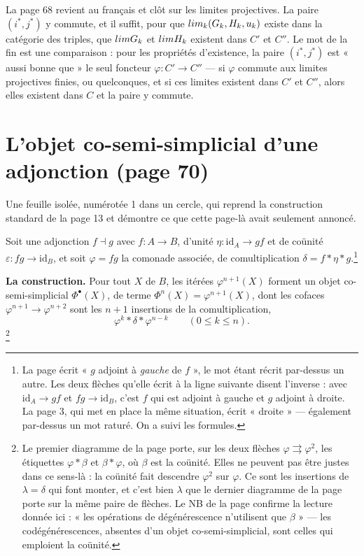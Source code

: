 \documentclass[11pt,a4paper]{article}
\begin{document}
La page 68 revient au français et clôt sur les limites projectives. La paire
$(i^{*}, j^{*})$ y commute, et il suffit, pour que
$\varprojlim_{k}(G_{k}, H_{k}, u_{k})$ existe dans la catégorie des triples,
que $\varprojlim G_{k}$ et $\varprojlim H_{k}$ existent dans $C'$ et $C''$. Le
mot de la fin est une comparaison : pour les propriétés d'existence, la paire
$(i^{*}, j^{*})$ est « aussi bonne que » le seul foncteur
$\varphi : C' \to C''$ — si $\varphi$ commute aux limites projectives finies,
ou quelconques, et si ces limites existent dans $C'$ et $C''$, alors elles
existent dans $C$ et la paire y commute.

\section*{L'objet co-semi-simplicial d'une adjonction (page 70)}

Une feuille isolée, numérotée 1 dans un cercle, qui reprend la construction
standard de la page 13 et démontre ce que cette page-là avait seulement
annoncé.

Soit une adjonction $f \dashv g$ avec $f : A \to B$, d'unité
$\eta : \mathrm{id}_{A} \to gf$ et de coünité
$\varepsilon : fg \to \mathrm{id}_{B}$, et soit $\varphi = fg$ la comonade
associée, de comultiplication $\delta = f * \eta * g$.\footnote{La page écrit
« $g$ adjoint à \emph{gauche} de $f$ », le mot étant récrit par-dessus un
autre. Les deux flèches qu'elle écrit à la ligne suivante disent l'inverse :
avec $\mathrm{id}_{A} \to gf$ et $fg \to \mathrm{id}_{B}$, c'est $f$ qui est
adjoint à gauche et $g$ adjoint à droite. La page 3, qui met en place la même
situation, écrit « droite » — également par-dessus un mot raturé. On a suivi
les formules.}


\textbf{La construction.} Pour tout $X$ de $B$, les itérées $\varphi^{n+1}(X)$
forment un objet co-semi-simplicial $\Phi^{\bullet}(X)$, de terme
$\Phi^{n}(X) = \varphi^{n+1}(X)$, dont les cofaces
$\varphi^{n+1} \to \varphi^{n+2}$ sont les $n+1$ insertions de la
comultiplication,
\[
  \varphi^{k} * \delta * \varphi^{n-k} \qquad (0 \leqslant k \leqslant n) .
\]
\footnote{Le premier diagramme de la page porte, sur les deux flèches
$\varphi \rightrightarrows \varphi^{2}$, les étiquettes $\varphi * \beta$ et
$\beta * \varphi$, où $\beta$ est la coünité. Elles ne peuvent pas être justes
dans ce sens-là : la coünité fait descendre $\varphi^{2}$ sur $\varphi$. Ce
sont les insertions de $\lambda = \delta$ qui font monter, et c'est bien
$\lambda$ que le dernier diagramme de la page porte sur la même paire de
flèches. Le NB de la page confirme la lecture donnée ici : « les opérations de
dégénérescence n'utilisent que $\beta$ » — les codégénérescences, absentes d'un
objet co-semi-simplicial, sont celles qui emploient la coünité.}
\end{document}
